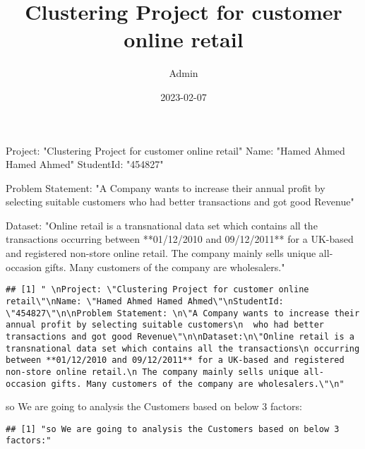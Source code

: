 \documentclass[
]{article}
\title{Clustering Project for customer online retail}
\author{Admin}
\date{2023-02-07}
\newenvironment{Shaded}{\begin{snugshade}}{\end{snugshade}}
\newcommand{\StringTok}[1]{\textcolor[rgb]{0.31,0.60,0.02}{#1}}
\begin{document}
\maketitle

\begin{Shaded}
\begin{Highlighting}[]
\StringTok{\textquotesingle{} }
\StringTok{Project: "Clustering Project for customer online retail"}
\StringTok{Name: "Hamed Ahmed Hamed Ahmed"}
\StringTok{StudentId: "454827"}

\StringTok{Problem Statement: }
\StringTok{"A Company wants to increase their annual profit by selecting suitable customers}
\StringTok{  who had better transactions and got good Revenue"}

\StringTok{Dataset:}
\StringTok{"Online retail is a transnational data set which contains all the transactions}
\StringTok{ occurring between **01/12/2010 and 09/12/2011** for a UK{-}based and registered non{-}store online retail.}
\StringTok{ The company mainly sells unique all{-}occasion gifts. Many customers of the company are wholesalers."}
\StringTok{\textquotesingle{}}
\end{Highlighting}
\end{Shaded}

\begin{verbatim}
## [1] " \nProject: \"Clustering Project for customer online retail\"\nName: \"Hamed Ahmed Hamed Ahmed\"\nStudentId: \"454827\"\n\nProblem Statement: \n\"A Company wants to increase their annual profit by selecting suitable customers\n  who had better transactions and got good Revenue\"\n\nDataset:\n\"Online retail is a transnational data set which contains all the transactions\n occurring between **01/12/2010 and 09/12/2011** for a UK-based and registered non-store online retail.\n The company mainly sells unique all-occasion gifts. Many customers of the company are wholesalers.\"\n"
\end{verbatim}

\begin{Shaded}
\begin{Highlighting}[]
\StringTok{\textquotesingle{}so We are going to analysis the Customers based on below 3 factors:\textquotesingle{}}
\end{Highlighting}
\end{Shaded}

\begin{verbatim}
## [1] "so We are going to analysis the Customers based on below 3 factors:"
\end{verbatim}
\end{document}
